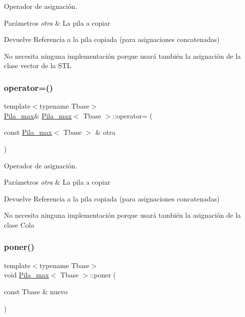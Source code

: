 Operador de asignación. 


\begin{DoxyParams}{Parámetros}
{\em otra} & La pila a copiar \\
\hline
\end{DoxyParams}
\begin{DoxyReturn}{Devuelve}
Referencia a la pila copiada (para asignaciones concatenadas)
\end{DoxyReturn}
No necesita ninguna implementación porque usará también la asignación de la clase vector de la S\+TL \mbox{\label{classPila__max_a9dd8b206b245be51149a2100a83529c7}} 
\subsubsection{\texorpdfstring{operator=()}{operator=()}\hspace{0.1cm}{\footnotesize\ttfamily [2/2]}}
{\footnotesize\ttfamily template$<$typename Tbase$>$ \\
\hyperlink{classPila__max}{Pila\+\_\+max}\& \hyperlink{classPila__max}{Pila\+\_\+max}$<$ Tbase $>$\+::operator= (\begin{DoxyParamCaption}\item[{const \hyperlink{classPila__max}{Pila\+\_\+max}$<$ Tbase $>$ \&}]{otra }\end{DoxyParamCaption})\hspace{0.3cm}{\ttfamily [default]}}



Operador de asignación. 


\begin{DoxyParams}{Parámetros}
{\em otra} & La pila a copiar \\
\hline
\end{DoxyParams}
\begin{DoxyReturn}{Devuelve}
Referencia a la pila copiada (para asignaciones concatenadas)
\end{DoxyReturn}
No necesita ninguna implementación porque usará también la asignación de la clase Cola \mbox{\label{classPila__max_a08e06bab9c6269a0906b6ff47a533088}} 
\subsubsection{\texorpdfstring{poner()}{poner()}\hspace{0.1cm}{\footnotesize\ttfamily [1/2]}}
{\footnotesize\ttfamily template$<$typename Tbase$>$ \\
void \hyperlink{classPila__max}{Pila\+\_\+max}$<$ Tbase $>$\+::poner (\begin{DoxyParamCaption}\item[{const Tbase \&}]{nuevo }\end{DoxyParamCaption})}



